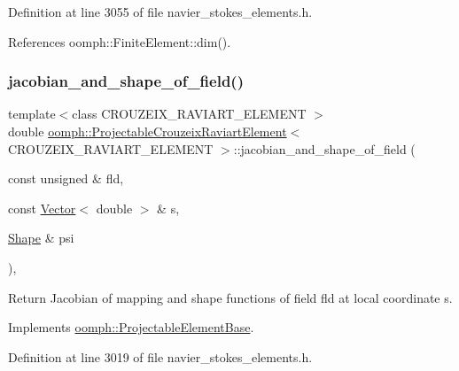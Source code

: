 Definition at line 3055 of file navier\+\_\+stokes\+\_\+elements.\+h.



References oomph\+::\+Finite\+Element\+::dim().

\mbox{\label{classoomph_1_1ProjectableCrouzeixRaviartElement_a91b2d0d2f6cb0fdfe3cd8d4f93373b05}} 
\subsubsection{\texorpdfstring{jacobian\+\_\+and\+\_\+shape\+\_\+of\+\_\+field()}{jacobian\_and\_shape\_of\_field()}}
{\footnotesize\ttfamily template$<$class C\+R\+O\+U\+Z\+E\+I\+X\+\_\+\+R\+A\+V\+I\+A\+R\+T\+\_\+\+E\+L\+E\+M\+E\+NT $>$ \\
double \hyperlink{classoomph_1_1ProjectableCrouzeixRaviartElement}{oomph\+::\+Projectable\+Crouzeix\+Raviart\+Element}$<$ C\+R\+O\+U\+Z\+E\+I\+X\+\_\+\+R\+A\+V\+I\+A\+R\+T\+\_\+\+E\+L\+E\+M\+E\+NT $>$\+::jacobian\+\_\+and\+\_\+shape\+\_\+of\+\_\+field (\begin{DoxyParamCaption}\item[{const unsigned \&}]{fld,  }\item[{const \hyperlink{classoomph_1_1Vector}{Vector}$<$ double $>$ \&}]{s,  }\item[{\hyperlink{classoomph_1_1Shape}{Shape} \&}]{psi }\end{DoxyParamCaption})\hspace{0.3cm}{\ttfamily [inline]}, {\ttfamily [virtual]}}



Return Jacobian of mapping and shape functions of field fld at local coordinate s. 



Implements \hyperlink{classoomph_1_1ProjectableElementBase_ad45c21b58c0985d52f68ab2d79cbb488}{oomph\+::\+Projectable\+Element\+Base}.



Definition at line 3019 of file navier\+\_\+stokes\+\_\+elements.\+h.



